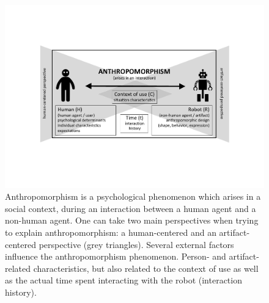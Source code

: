 \documentclass{frontiersSCNS} %
\begin{document}
\begin{figure}
    \centering
    \includegraphics[width=0.75\columnwidth]{anthropo.pdf}
    \caption{Anthropomorphism is a psychological phenomenon which arises in a
        social context, during an interaction between a human agent and a
        non-human agent. One can take two main perspectives when trying to
        explain anthropomorphism: a human-centered and an artifact-centered
        perspective (grey triangles). Several external factors influence the
        anthropomorphism phenomenon. Person- and artifact-related characteristics,
        but also related to the context of use as well as the actual time spent
        interacting with the robot (interaction history).}

    \label{fig:anthropofig}
\end{figure}

%
%
%
%

%
%
%
%
%
%
\end{document}
